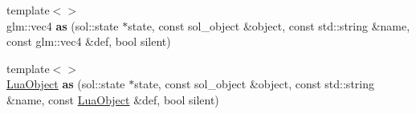 \begin{DoxyCompactItemize}
\item 
\mbox{\label{classTarbora_1_1LuaType_a866559a1ec5eb246b4fd59ec0788c9be}} 
{\footnotesize template$<$$>$ }\\glm\+::vec4 {\bfseries as} (sol\+::state $\ast$state, const sol\+\_\+object \&object, const std\+::string \&name, const glm\+::vec4 \&def, bool silent)
\item 
\mbox{\label{classTarbora_1_1LuaType_a0dce7a3267a752ec6d38771bf3020a1b}} 
{\footnotesize template$<$$>$ }\\\hyperlink{classTarbora_1_1LuaObject}{Lua\+Object} {\bfseries as} (sol\+::state $\ast$state, const sol\+\_\+object \&object, const std\+::string \&name, const \hyperlink{classTarbora_1_1LuaObject}{Lua\+Object} \&def, bool silent)
\end{DoxyCompactItemize}
